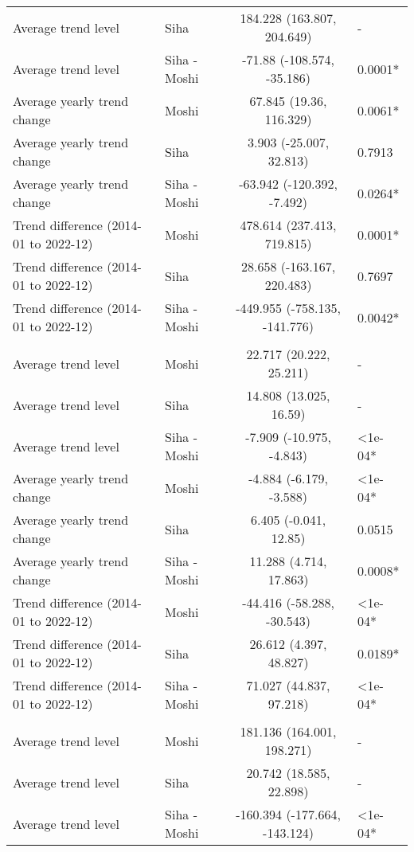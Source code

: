 \begin{longtable}{l|lcl}
Average trend level & Siha & 184.228 (163.807, 204.649) & - \\ 
Average trend level & Siha - Moshi & -71.88 (-108.574, -35.186) & 0.0001* \\ 
Average yearly trend change & Moshi & 67.845 (19.36, 116.329) & 0.0061* \\ 
Average yearly trend change & Siha & 3.903 (-25.007, 32.813) & 0.7913 \\ 
Average yearly trend change & Siha - Moshi & -63.942 (-120.392, -7.492) & 0.0264* \\ 
Trend difference (2014-01 to 2022-12) & Moshi & 478.614 (237.413, 719.815) & 0.0001* \\ 
Trend difference (2014-01 to 2022-12) & Siha & 28.658 (-163.167, 220.483) & 0.7697 \\ 
Trend difference (2014-01 to 2022-12) & Siha - Moshi & -449.955 (-758.135, -141.776) & 0.0042* \\ 
\midrule\addlinespace[2.5pt]
\multicolumn{4}{l}{Poisoning} \\ 
\midrule\addlinespace[2.5pt]
Average trend level & Moshi & 22.717 (20.222, 25.211) & - \\ 
Average trend level & Siha & 14.808 (13.025, 16.59) & - \\ 
Average trend level & Siha - Moshi & -7.909 (-10.975, -4.843) & <1e-04* \\ 
Average yearly trend change & Moshi & -4.884 (-6.179, -3.588) & <1e-04* \\ 
Average yearly trend change & Siha & 6.405 (-0.041, 12.85) & 0.0515 \\ 
Average yearly trend change & Siha - Moshi & 11.288 (4.714, 17.863) & 0.0008* \\ 
Trend difference (2014-01 to 2022-12) & Moshi & -44.416 (-58.288, -30.543) & <1e-04* \\ 
Trend difference (2014-01 to 2022-12) & Siha & 26.612 (4.397, 48.827) & 0.0189* \\ 
Trend difference (2014-01 to 2022-12) & Siha - Moshi & 71.027 (44.837, 97.218) & <1e-04* \\ 
\midrule\addlinespace[2.5pt]
\multicolumn{4}{l}{Psychoses} \\ 
\midrule\addlinespace[2.5pt]
Average trend level & Moshi & 181.136 (164.001, 198.271) & - \\ 
Average trend level & Siha & 20.742 (18.585, 22.898) & - \\ 
Average trend level & Siha - Moshi & -160.394 (-177.664, -143.124) & <1e-04* \\ 

\end{longtable}
